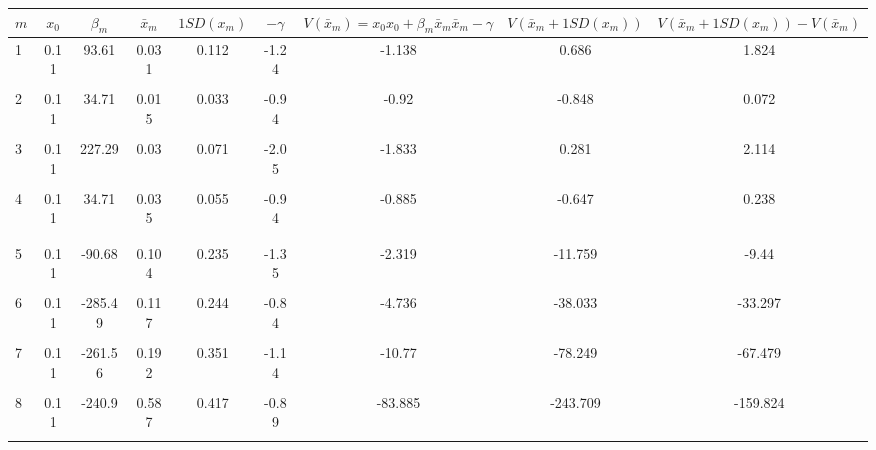 \begin{tabular}{@{\extracolsep{5pt}}lcccccccc}
\toprule 
$m$ & $x_0$ & $\beta_m$ & $\bar{x}_m$ & $1SD(x_m)$ & $-\gamma$ & $V(\bar{x}_m)=x_0 x_0 + \beta_m \bar{x}_m \bar{x}_m-\gamma$ & $V(\bar{x}_m+1SD(x_m))$ & $V(\bar{x}_m+1SD(x_m))-V(\bar{x}_m)$ \\
\midrule 
1 & 0.11 & 93.61 & 0.031 & 0.112 & -1.24 & -1.138 & 0.686 & 1.824 \\
 &  &  &  &  &  &  &  &  \\
2 & 0.11 & 34.71 & 0.015 & 0.033 & -0.94 & -0.92 & -0.848 & 0.072 \\
 &  &  &  &  &  &  &  &  \\
3 & 0.11 & 227.29 & 0.03 & 0.071 & -2.05 & -1.833 & 0.281 & 2.114 \\
 &  &  &  &  &  &  &  &  \\
4 & 0.11 & 34.71 & 0.035 & 0.055 & -0.94 & -0.885 & -0.647 & 0.238 \\
 &  &  &  &  &  &  &  &  \\
 &  &  &  &  &  &  &  &  \\
5 & 0.11 & -90.68 & 0.104 & 0.235 & -1.35 & -2.319 & -11.759 & -9.44 \\
 &  &  &  &  &  &  &  &  \\
6 & 0.11 & -285.49 & 0.117 & 0.244 & -0.84 & -4.736 & -38.033 & -33.297 \\
 &  &  &  &  &  &  &  &  \\
7 & 0.11 & -261.56 & 0.192 & 0.351 & -1.14 & -10.77 & -78.249 & -67.479 \\
 &  &  &  &  &  &  &  &  \\
8 & 0.11 & -240.9 & 0.587 & 0.417 & -0.89 & -83.885 & -243.709 & -159.824 \\
 &  &  &  &  &  &  &  &  \\
\bottomrule 
\end{tabular}
